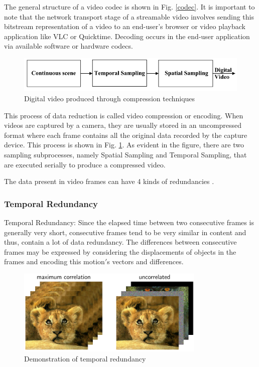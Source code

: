 \documentclass[letterpaper,12pt,titlepage,oneside,final]{report}
\begin{document}
            The general structure of a video codec is shown in Fig. \ref{codec}. It is important to note that the network transport stage of a streamable video involves sending this bitstream representation of a video to an end-user's browser or video playback application like VLC or Quicktime. Decoding occurs in the end-user application via available software or hardware codecs.
            \begin{figure}[!h]
                \centering
                \includegraphics[width=\textwidth]{videnc}
                \caption{Digital video produced through compression techniques}
                \label{videnc}
            \end{figure}

            This process of data reduction is called video compression or encoding. When videos are captured by a camera, they are usually stored in an uncompressed format where each frame contains all the original data recorded by the capture device. This process is shown in Fig. \ref{videnc}. As evident in the figure, there are two sampling subprocesses, namely Spatial Sampling and Temporal Sampling, that are executed serially to produce a compressed video. 

            The data present in video frames can have 4 kinds of redundancies \cite{Saggi2010}.
            \subsubsection{Temporal Redundancy} %
            \label{sub:temporal_redundancy}
                Temporal Redundancy: Since the elapsed time between two consecutive frames is generally very short, consecutive frames tend to be very similar in content and thus, contain a lot of data redundancy. The differences between consecutive frames may be expressed by considering the displacements of objects in the frames and encoding this motion$'$s vectors and differences. 
                \begin{figure}[!h]
                    \centering
                    \includegraphics[width=0.8\textwidth]{tempredun}
                    \caption{Demonstration of temporal redundancy\cite{Kundur}}
                    \label{tempredun}
                \end{figure}
\end{document}

